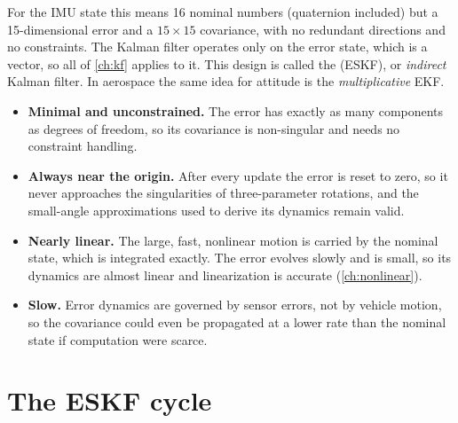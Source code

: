For the IMU state this means 16 nominal numbers (quaternion included) but a 15-dimensional error and a $15\times15$ covariance, with no redundant
directions and no constraints. The Kalman filter operates only on the error state, which is a vector, so all of \cref{ch:kf} applies to it. This
design is called the  (ESKF), or \emph{indirect} Kalman filter. In aerospace the same idea for attitude is the
\emph{multiplicative} EKF.

\begin{keyidea}
\begin{itemize}
  \item \textbf{Minimal and unconstrained.} The error has exactly as many components as degrees of freedom, so its covariance is non-singular and
        needs no constraint handling.
  \item \textbf{Always near the origin.} After every update the error is reset to zero, so it never approaches the singularities of
        three-parameter rotations, and the small-angle approximations used to derive its dynamics remain valid.
  \item \textbf{Nearly linear.} The large, fast, nonlinear motion is carried by the nominal state, which is integrated exactly. The error evolves
        slowly and is small, so its dynamics are almost linear and linearization is accurate (\cref{ch:nonlinear}).
  \item \textbf{Slow.} Error dynamics are governed by sensor errors, not by vehicle motion, so the covariance could even be propagated at a lower rate
        than the nominal state if computation were scarce.
\end{itemize}
\end{keyidea}

\section{The ESKF cycle}

